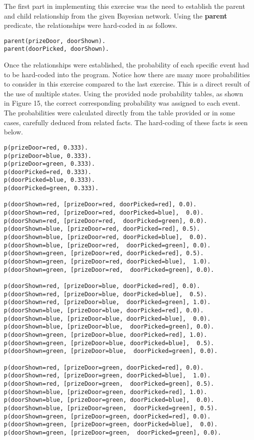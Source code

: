 \documentclass[11pt]{article}
\newcommand{\forceindent}{\leavevmode{\parindent=1em\indent}}
\begin{document}
\forceindent The first part in implementing this exercise was the need to establish the parent and child relationship from the given Bayesian network. Using the \textbf{parent} predicate, the relationships were hard-coded in as follows.
\begin{lstlisting}
parent(prizeDoor, doorShown).    
parent(doorPicked, doorShown).
\end{lstlisting}
\vspace{0.5cm}
\forceindent Once the relationships were established, the probability of each specific event had to be hard-coded into the program. Notice how there are many more probabilities to consider in this exercise compared to the last exercise. This is a direct result of the use of multiple states. Using the provided node probability tables, as shown in Figure 15, the correct corresponding probability was assigned to each event. The probabilities were calculated directly from the table provided or in some cases, carefully deduced from related facts. The hard-coding of these facts is seen below.

\begin{lstlisting}
p(prizeDoor=red, 0.333).
p(prizeDoor=blue, 0.333).
p(prizeDoor=green, 0.333).
p(doorPicked=red, 0.333).
p(doorPicked=blue, 0.333).
p(doorPicked=green, 0.333).

p(doorShown=red, [prizeDoor=red, doorPicked=red], 0.0).
p(doorShown=red, [prizeDoor=red, doorPicked=blue],  0.0).
p(doorShown=red, [prizeDoor=red,  doorPicked=green], 0.0).
p(doorShown=blue, [prizeDoor=red, doorPicked=red], 0.5).
p(doorShown=blue, [prizeDoor=red, doorPicked=blue],  0.0).
p(doorShown=blue, [prizeDoor=red,  doorPicked=green], 0.0).
p(doorShown=green, [prizeDoor=red, doorPicked=red], 0.5).
p(doorShown=green, [prizeDoor=red, doorPicked=blue],  1.0).
p(doorShown=green, [prizeDoor=red,  doorPicked=green], 0.0).

p(doorShown=red, [prizeDoor=blue, doorPicked=red], 0.0).
p(doorShown=red, [prizeDoor=blue, doorPicked=blue],  0.5).
p(doorShown=red, [prizeDoor=blue,  doorPicked=green], 1.0).
p(doorShown=blue, [prizeDoor=blue, doorPicked=red], 0.0).
p(doorShown=blue, [prizeDoor=blue, doorPicked=blue],  0.0).
p(doorShown=blue, [prizeDoor=blue,  doorPicked=green], 0.0).
p(doorShown=green, [prizeDoor=blue, doorPicked=red], 1.0).
p(doorShown=green, [prizeDoor=blue, doorPicked=blue],  0.5).
p(doorShown=green, [prizeDoor=blue,  doorPicked=green], 0.0).

p(doorShown=red, [prizeDoor=green, doorPicked=red], 0.0).
p(doorShown=red, [prizeDoor=green, doorPicked=blue],  1.0).
p(doorShown=red, [prizeDoor=green,  doorPicked=green], 0.5).
p(doorShown=blue, [prizeDoor=green, doorPicked=red], 1.0).
p(doorShown=blue, [prizeDoor=green, doorPicked=blue],  0.0).
p(doorShown=blue, [prizeDoor=green,  doorPicked=green], 0.5).
p(doorShown=green, [prizeDoor=green, doorPicked=red], 0.0).
p(doorShown=green, [prizeDoor=green, doorPicked=blue],  0.0).
p(doorShown=green, [prizeDoor=green,  doorPicked=green], 0.0).
\end{lstlisting}
\end{document}
